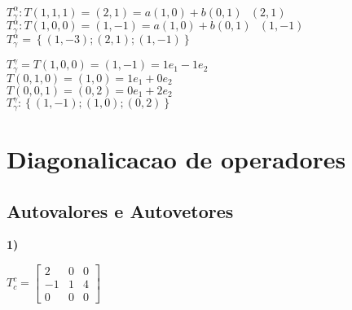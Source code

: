 \documentclass[a4paper,12pt]{report}
\begin{document}
$T_\gamma^\alpha : T(1,1,1) = (2,1) = a(1,0) + b(0,1)  \ \ \ (2,1)$\\

$T_\gamma^\alpha : T(1,0,0) = (1,-1) = a(1,0) +b(0,1)  \ \ \ (1,-1)$\\

$T_\gamma^\alpha = \left \{ (1,-3); (2,1);(1,-1) \right \}$


$T_\gamma^\gamma = T(1,0,0) = (1,-1) = 1e_1 - 1e_2 $\\
$T(0,1,0) =(1,0) = 1e_1 + 0e_2 $\\
$T(0,0,1) = (0,2) = 0e_1 + 2e_2 $ \\


$T_\gamma^\gamma : \left \{ ( 1,-1); (1,0); (0,2) \right \}$


\chapter{Diagonalicacao de operadores }
\section{Autovalores e Autovetores}
\textbf{1)}

$T_c^c= \left [\begin{array}{rrr}
2&0&0\\
-1&1&4\\
0&0&0
\end{array}\right]$ \\
\end{document}
